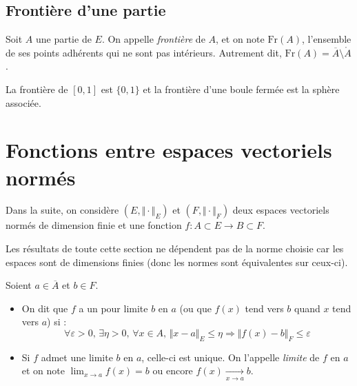 \documentclass[french,11pt,twoside]{VcCours}
\begin{document}
\subsection{Frontière d'une partie}

\begin{Definition}{} Soit $A$ une partie de $E$. On appelle \emph{frontière} de $A$, et on note $\textrm{Fr}(A)$, l'ensemble de ses points adhérents qui ne sont pas intérieurs. Autrement dit, $\textrm{Fr}(A) = \overline{A} \setminus \mathring{A}$.
\end{Definition} 

\begin{Exemple} La frontière de $[0,1]$ est $\lbrace 0,1 \rbrace$ et la frontière d'une boule fermée est la sphère associée.
\end{Exemple}

\section{Fonctions entre espaces vectoriels normés}

Dans la suite, on considère $(E, \Vert \cdot \Vert_E)$ et $(F, \Vert \cdot \Vert_F)$ deux espaces vectoriels normés de dimension finie et une fonction $f : A \subset E \rightarrow B \subset F$.

\begin{Theoreme}{} Les résultats de toute cette section ne dépendent pas de la norme choisie car les espaces sont de dimensions finies (donc les normes sont équivalentes sur ceux-ci).
\end{Theoreme}


\begin{TheoremeDefinition}{} Soient $a \in \overline{A}$ et $b \in F$.

\begin{itemize}
\item On dit que $f$ a un pour limite $b$ en $a$ (ou que $f(x)$ tend vers $b$ quand $x$ tend vers $a$) si :
$$ \forall \varepsilon >0, \, \exists \eta > 0, \, \forall x \in A, \, \Vert x- a \Vert_E \leq \eta \Rightarrow \Vert f(x) - b \Vert_F \leq \varepsilon$$
\item Si $f$ admet une limite $b$ en $a$, celle-ci est unique. On l'appelle \emph{limite} de $f$ en $a$ et on note $\lim_{x \rightarrow a} f(x) = b$ ou encore $f(x) \underset{x \rightarrow a}{\rightarrow} b$.
\end{itemize}
\end{TheoremeDefinition}
\end{document}
